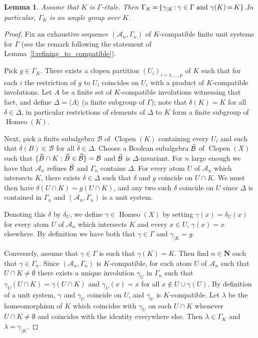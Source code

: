 \documentclass[10pt,a4paper]{article}
\newtheorem{lemm}[theo]{Lemma}
\theoremstyle{definition}
\DeclareMathOperator{\Homeo}{Homeo}
\DeclareMathOperator{\Clopen}{Clopen}
\newcommand{\N}{\mathbf{N}}
\newcommand{\mcA}{\mathcal{A}}
\newcommand{\mcB}{\mathcal{B}}
\newcommand*{\Mk}{\mkern -2mu}
\let\oldtilde\tilde
\renewcommand*{\tilde}[1]{\mathchoice{\widetilde{#1}}{\widetilde{#1}}{\oldtilde{#1}}{\oldtilde{#1}}}
\begin{document}
\begin{lemm}\label{l:induced_group_is_what_you_expect}
%
\!\!
Assume that $K$ is $\Gamma$-étale. Then $\Gamma_K\Mk =\Mk\{\gamma_{|K}\Mk :\Mk \gamma \in \Gamma \text{ and } \gamma(K)\Mk=\Mk K\}$.\linebreak In particular, $\Gamma_K$ is an ample group over $K$.
\end{lemm}

\begin{proof}
Fix an exhaustive sequence $(\mcA_n,\Gamma_n)$ of $K$-compatible finite unit systems for $\Gamma$ (see the remark following the statement of Lemma~\ref{l:refining_to_compatible}).

Pick $g \in \Gamma_K$. There exists a clopen partition $(U_i)_{i=1,\dots,p}$ of $K$ such that for each $i$ the restriction of $g$ to $U_i$ coincides on $U_i$ with a product of $K$-compatible involutions. Let $A$ be a finite set of $K$-compatible involutions witnessing that fact, and define $\Delta=\langle A\rangle$ (a finite subgroup of $\Gamma$); note that $\delta(K)=K$ for all $\delta \in \Delta$, in particular restrictions of elements of $\Delta$ to $K$ form a finite subgroup of $\Homeo(K)$.

Next, pick a finite subalgebra $\mcB$ of $\Clopen(K)$ containing every $U_i$ and such that $\delta(B) \in \mcB$ for all $\delta \in \Delta$. Choose a Boolean subalgebra $\tilde \mcB$ of $\Clopen(X)$ such that $\{ \tilde B \cap K : \tilde B \in \tilde \mcB \}=\mcB$ and $\tilde \mcB$ is $\Delta$-invariant. For $n$ large enough we have that $\mcA_n$ refines $\tilde \mcB$ and $\Gamma_n$ contains $\Delta$. For every atom $U$ of $\mcA_n$ which intersects $K$, there exists $\delta \in \Delta$ such that $\delta$ and $g$ coincide on $U \cap K$. We must then have $\delta(U \cap K)= g(U \cap K)$, and any two such $\delta$ coincide on $U$ since $\Delta$ is contained in $\Gamma_n$ and $(\mcA_n,\Gamma_n)$ is a unit system.

Denoting this $\delta$ by $\delta_U$, we define $\gamma \in \Homeo(X)$ by setting $\gamma(x)=\delta_U(x)$ for every atom $U$ of $\mcA_n$ which intersects $K$ and every $x \in U$, $\gamma(x)=x$ elsewhere. By definition we have both that $\gamma \in \Gamma$ and $\gamma_{|K}=g$.

Conversely, assume that $\gamma \in \Gamma$ is such that $\gamma(K)=K$. Then find $n \in \N$ such that $\gamma \in \Gamma_n$. Since $(\mcA_n,\Gamma_n)$ is $K$-compatible, for each atom $U$ of $\mcA_n$ such that $U \cap K \ne \emptyset$ there exists a unique involution $\gamma_U$ in $\Gamma_n$ such that $\gamma_U(U \cap K)= \gamma(U \cap K)$ and $\gamma_U(x)=x$ for all $x \not \in U \cup \gamma(U)$. By definition of a unit system, $\gamma$ and $\gamma_U$ coincide on $U$, and $\gamma_U$ is $K$-compatible. Let $\lambda$ be the homeomorphism of $K$ which coincides with $\gamma_U$ on each $U \cap K$ whenever $U \cap K \ne \emptyset$ and coincides with the identity everywhere else. Then $\lambda \in \Gamma_K$ and $\lambda=\gamma_{|K}$.
\end{proof}
\end{document}
